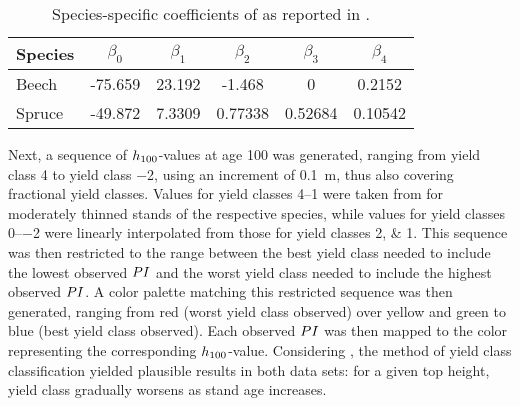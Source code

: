 \begin{singlespace}
  {\tabulinesep=2mm
    \begin{longtabu}{L S[table-figures-decimal = 3] S[table-figures-decimal = 4] S[table-figures-decimal = 5] S[table-figures-decimal = 5] S[table-figures-decimal = 5]}
      \caption{Species-specific coefficients of  as reported in \textcite{Nagel1999}.  \label{tab:NagelFunctionCoefficients}} \\
      \toprule
      Species & {\(\beta_0\)} & {\(\beta_1\)} & {\(\beta_2\)} & {\(\beta_3\)} & {\(\beta_4\)} \\
      \midrule
      \endhead
      \bottomrule
      \endlastfoot
      Beech & -75.659 & 23.192 & -1.468 & 0 & 0.2152 \\
      Spruce & -49.872 & 7.3309 & 0.77338 & 0.52684 & 0.10542 \\
    \end{longtabu}
  }
\end{singlespace}

Next, a sequence of \(h_{100}{}\)-values at age \SI{100}{\year} was generated, ranging from yield class \num{4} to yield class \num{-2}, using an increment of \SI{0.1}{\meter}, thus also covering fractional yield classes.  Values for yield classes \numrange{4}{1} were taken from \textcite{Schober1995} for moderately thinned stands of the respective species, while values for yield classes \numrange{0}{-2} were linearly interpolated from those for yield classes \numlist{2; 1}.   This sequence was then restricted to the range between the best yield class needed to include the lowest observed \(PI{}\) and the worst yield class needed to include the highest observed \(PI{}\).  A color palette matching this restricted sequence was then generated, ranging from red (worst yield class observed) over yellow and green to blue (best yield class observed).  Each observed \(PI{}\) was then mapped to the color representing the corresponding \(h_{100}{}\)-value.  Considering , the method of yield class classification yielded plausible results in both data sets:  for a given top height, yield class gradually worsens as stand age increases.


